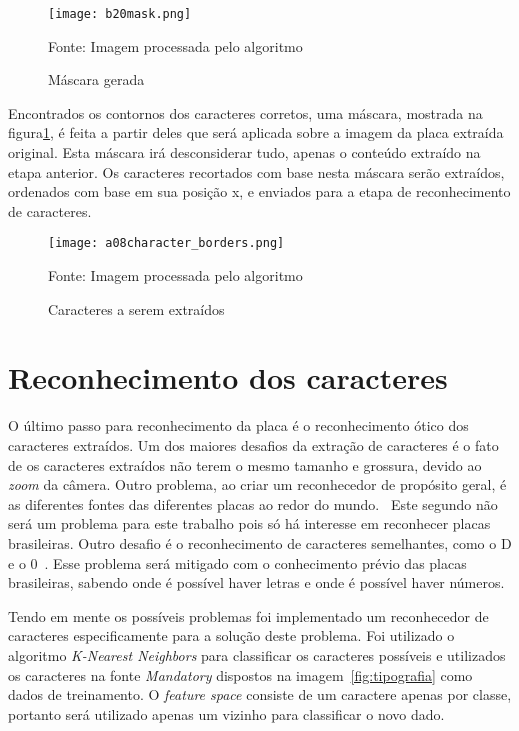 \begin{figure}[H]
	\centering
	\texttt{[image: b20mask.png]}
	\caption{Máscara gerada}
Fonte: Imagem processada pelo algoritmo
	\label{fig:mascara}
\end{figure}

Encontrados os contornos dos caracteres corretos, uma máscara, mostrada na figura\ref{fig:mascara}, é feita a partir deles que será aplicada sobre a imagem da placa extraída original. Esta máscara irá desconsiderar tudo, apenas o conteúdo extraído na etapa anterior. Os caracteres recortados com base nesta máscara serão extraídos, ordenados com base em sua posição x, e enviados para a etapa de reconhecimento de caracteres.

\begin{figure}[H]
	\centering
	\texttt{[image: a08character\_borders.png]}
	\caption{Caracteres a serem extraídos}
Fonte: Imagem processada pelo algoritmo
	\label{fig:caracteres_extraidos}
\end{figure}

\section{Reconhecimento dos caracteres} \label{sec:reconhecimento}

O último passo para reconhecimento da placa é o reconhecimento ótico dos
caracteres extraídos. Um dos maiores desafios da extração de caracteres é o fato de
os caracteres extraídos não terem o mesmo tamanho e grossura, devido ao
\emph{zoom} da câmera. Outro problema, ao criar um reconhecedor de propósito
geral, é as diferentes fontes das diferentes placas ao redor do mundo.~\cite{s2013automatic}
Este segundo não será um problema para este trabalho pois
só há interesse em reconhecer placas brasileiras. Outro desafio é o
reconhecimento de caracteres semelhantes, como o D e o
0~\cite{ho2016intelligent}.  Esse problema será mitigado com o conhecimento
prévio das placas brasileiras, sabendo onde é possível haver letras e onde é
possível haver números.

Tendo em mente os possíveis problemas foi implementado um reconhecedor de caracteres especificamente para a solução deste problema. Foi utilizado o algoritmo \emph{K-Nearest Neighbors} para classificar os caracteres possíveis e utilizados os caracteres na fonte \emph{Mandatory} dispostos na imagem~\ref{fig:tipografia} como dados de treinamento. O \emph{feature space} consiste de um caractere apenas por classe, portanto será utilizado apenas um vizinho para classificar o novo dado.

